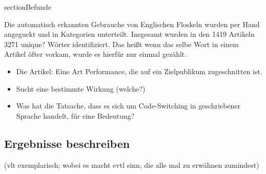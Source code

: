 section{Befunde}


Die automatisch erkannten Gebrauche von Englischen Floskeln wurden per Hand angeguckt und in Kategorien unterteilt.
Insgesamt wurden in den 1419 Artikeln 3271 unique? Wörter identifiziert.
Das heißt wenn das selbe Wort in einem Artikel öfter vorkam, wurde es hierfür nur einmal gezählt.

\begin{itemize}
  \item Die Artikel: Eine Art Performance, die auf ein Zielpublikum zugeschnitten ist.
  \item Sucht eine bestimmte Wirkung (welche?)
  \item Was hat die Tatsache, dass es sich um Code-Switching in geschriebener Sprache handelt, für eine Bedeutung?
\end{itemize}

\subsection{Ergebnisse beschreiben}
(vlt exemplarisch; wobei es macht evtl sinn, die alle mal zu erwähnen zumindest)

